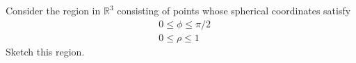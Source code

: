 \begin{problem}
Consider the region in $\mathbb{R}^3$ consisting of points whose spherical coordinates satisfy
\begin{align*}
&0\leq \phi\leq \pi/2\\
&0\leq \rho\leq 1
\end{align*}
Sketch this region.
\end{problem}